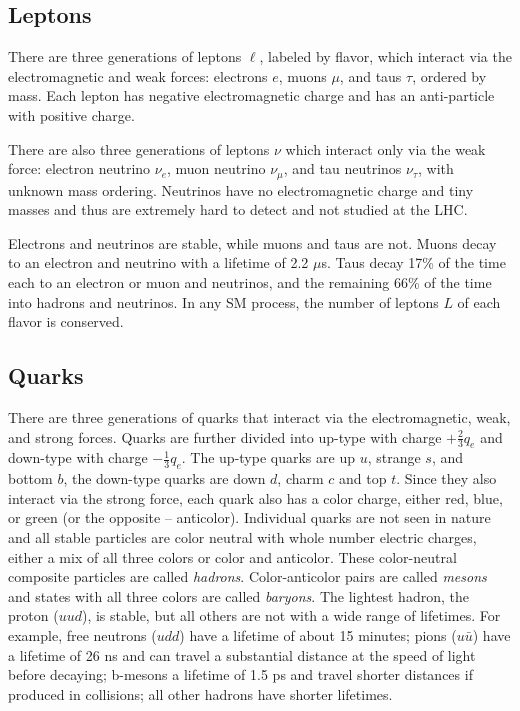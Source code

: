 \subsection{Leptons}
There are three generations of leptons $\ell$, labeled by flavor, which interact via the electromagnetic and weak forces: electrons $e$, muons $\mu$, and taus $\tau$, ordered by mass. Each lepton has negative electromagnetic charge and has an anti-particle with positive charge. 

There are also three generations of leptons $\nu$ which interact only via the weak force: electron neutrino $\nu_{e}$, muon neutrino $\nu_{\mu}$, and tau neutrinos $\nu_{\tau}$, with unknown mass ordering. Neutrinos have no electromagnetic charge and tiny masses and thus are extremely hard to detect and not studied at the \ac{LHC}. 

Electrons and neutrinos are stable, while muons and taus are not. Muons decay to an electron and neutrino with a lifetime of 2.2 $\mu$s. Taus decay 17\% of the time each to an electron or muon and neutrinos, and the remaining 66\% of the time into hadrons and neutrinos. In any \ac{SM} process, the number of leptons $L$ of each flavor is conserved. 


\subsection{Quarks}
There are three generations of quarks that interact via the electromagnetic, weak, and strong forces. Quarks are further divided into up-type with charge $+\frac{2}{3}q_{e}$ and down-type with charge $-\frac{1}{3}q_{e}$. The up-type quarks are up $u$, strange $s$, and bottom $b$, the down-type quarks are down $d$, charm $c$ and top $t$. Since they also interact via the strong force, each quark also has a color charge, either red, blue, or green (or the opposite -- anticolor). Individual quarks are not seen in nature and all stable particles are color neutral with whole number electric charges, either a mix of all three colors or color and anticolor. These color-neutral composite particles are called \emph{hadrons}. Color-anticolor pairs are called \emph{mesons} and states with all three colors are called \emph{baryons}. The lightest hadron, the proton ($uud$), is stable, but all others are not with a wide range of lifetimes. For example, free neutrons ($udd$) have a lifetime of about 15 minutes; pions ($u\bar{u}$) have a lifetime of 26 ns and can travel a substantial distance at the speed of light before decaying; b-mesons a lifetime of 1.5 ps and travel shorter distances if produced in collisions; all other hadrons have shorter lifetimes. 

